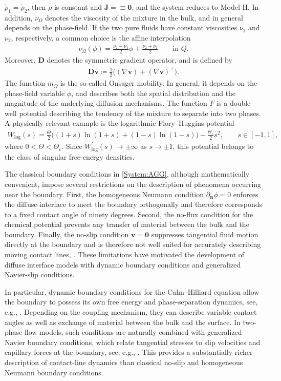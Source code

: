\documentclass[11pt,reqno]{amsart}
\theoremstyle{remark}
\numberwithin{equation}{section}
\newcommand{\n}{\mathbf{n}}
\newcommand{\deln}{\partial_\n}
\newcommand{\Grad}{\nabla}
\newcommand{\Om}{\Omega}
\newcommand{\J}{\mathbf J}
\newcommand{\bv}{\mathbf v}
\newcommand{\D}{\mathbf D}
\begin{document}
$\tilde\rho_1=\tilde\rho_2$, then $\rho$ is constant and $\J=
\equiv\mathbf 0$, and the system reduces to Model H.
In addition, $\nu_\Om$ denotes the viscosity of the mixture in the bulk, and in general depends on the phase-field. If the two pure fluids have constant viscosities $\nu_1$ and $\nu_2$, respectively, a common choice is the affine interpolation
\begin{align*}
    \nu_\Om(\phi) = \frac{\nu_2-\nu_1}{2}\phi + \frac{\nu_2+\nu_1}{2} \qquad\text{in~}Q.
\end{align*}
Moreover, $\D$ denotes the symmetric gradient operator, and is defined by
\begin{align*}
    \D\bv\coloneqq \frac12\Big((\Grad\bv) + (\Grad\bv)^\top\Big).
\end{align*}
The function $m_\Om$ is the so-called Onsager mobility. In general, it depends on the phase-field variable $\phi$, and describes both the spatial distribution and the magnitude of the underlying diffusion mechanisms. The function $F$ is a double-well potential describing the tendency of the mixture to separate into two phases. A physically relevant example is the logarithmic Flory--Huggins potential
\begin{align*}
    W_\mathrm{log}(s) = \frac{\Theta}{2}\big((1+s)\ln(1+s)+(1-s)\ln(1-s)\big) - \frac{\Theta_c}{2}s^2, \qquad s\in[-1,1],
\end{align*}
where $0<\Theta<\Theta_c$. Since
$W_\mathrm{log}^\prime(s)\to\pm\infty$ as $s\to\pm1$, this potential belongs to the class of singular free-energy densities.

The classical boundary conditions in \eqref{System:AGG}, although mathematically convenient, impose several restrictions on the description of phenomena occurring near the boundary. First, the homogeneous Neumann condition $\deln\phi=0$ enforces the diffuse interface to meet the boundary orthogonally and therefore corresponds to a fixed contact angle of ninety degrees. Second, the no-flux condition for the chemical potential prevents any transfer of material between the bulk and the boundary. Finally, the no-slip condition $\bv=\mathbf 0$ suppresses tangential fluid motion directly at the boundary and is therefore not well suited for accurately describing moving contact lines, \cite{Dussan1979,Qian2006,Seppecher1996}. These limitations have motivated the development of diffuse interface models with dynamic boundary conditions and generalized Navier-slip conditions.

In particular, dynamic boundary conditions for the Cahn--Hilliard equation allow the boundary to possess its own free energy and phase-separation dynamics, see, e.g., \cite{Goldstein2011,Liu2019,Knopf2021a,Knopf2020}. Depending on the coupling mechanism, they can describe variable contact angles as well as exchange of material between the bulk and the surface. In two-phase flow models, such conditions are naturally combined with generalized Navier boundary conditions, which relate tangential stresses to slip velocities and capillary forces at the boundary, see, e.g., \cite{Chan2025, Gal2016, Gal2019, Giorgini2023, Gal2024, Gal2023, Knopf2025a}. This provides a substantially richer description of contact-line dynamics than classical no-slip and homogeneous Neumann boundary conditions.
\end{document}
